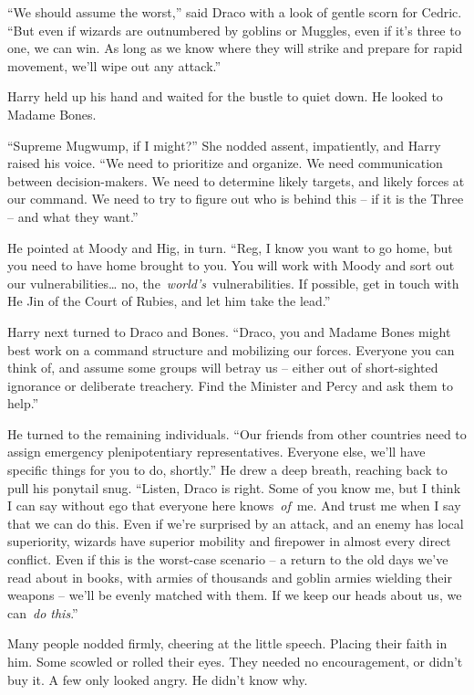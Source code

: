 ``We should assume the worst,'' said Draco with a look of gentle scorn
for Cedric. ``But even if wizards are outnumbered by goblins or Muggles,
even if it's three to one, we can win. As long as we know where they
will strike and prepare for rapid movement, we'll wipe out any attack.''

Harry held up his hand and waited for the bustle to quiet down. He
looked to Madame Bones.

``Supreme Mugwump, if I might?'' She nodded assent, impatiently, and
Harry raised his voice. ``We need to prioritize and organize. We need
communication between decision-makers. We need to determine likely
targets, and likely forces at our command. We need to try to figure out
who is behind this -- if it is the Three -- and what they want.''

He pointed at Moody and Hig, in turn. ``Reg, I know you want to go home,
but you need to have home brought to you. You will work with Moody and
sort out our vulnerabilities\ldots{} no,
the~\emph{world's}~vulnerabilities. If possible, get in touch with He
Jin of the Court of Rubies, and let him take the lead.''

Harry next turned to Draco and Bones. ``Draco, you and Madame Bones
might best work on a command structure and mobilizing our forces.
Everyone you can think of, and assume some groups will betray us --
either out of short-sighted ignorance or deliberate treachery. Find the
Minister and Percy and ask them to help.''

He turned to the remaining individuals. ``Our friends from other
countries need to assign emergency plenipotentiary representatives.
Everyone else, we'll have specific things for you to do, shortly.'' He
drew a deep breath, reaching back to pull his ponytail snug. ``Listen,
Draco is right. Some of you know me, but I think I can say without ego
that everyone here knows~\emph{of}~me. And trust me when I say that we
can do this. Even if we're surprised by an attack, and an enemy has
local superiority, wizards have superior mobility and firepower in
almost every direct conflict. Even if this is the worst-case scenario --
a return to the old days we've read about in books, with armies of
thousands and goblin armies wielding their weapons -- we'll be evenly
matched with them. If we keep our heads about us, we can~\emph{do
this}.''

Many people nodded firmly, cheering at the little speech. Placing their
faith in him. Some scowled or rolled their eyes. They needed no
encouragement, or didn't buy it. A few only looked angry. He didn't know
why.

